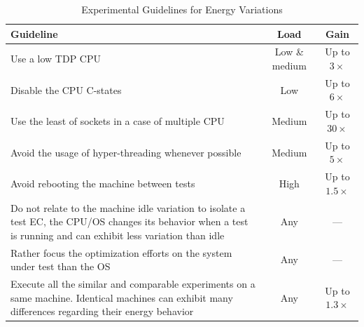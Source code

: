\begin{table}[h!]
    \centering
    \caption{Experimental Guidelines for Energy Variations}
    \small
    \begin{tabular}{|p{4.7cm}|c|c|}
        \hline
        \textbf{Guideline}                                                                                                                                                & \textbf{Load} & \textbf{Gain}     \\
        \hline
        \hline
        Use a low TDP CPU                                                                                                                                                 & Low \& medium & Up to $3\times$   \\
        \hline
        Disable the CPU C-states                                                                                                                                          & Low           & Up to $6\times$   \\
        \hline
        Use the least of sockets in a case of multiple CPU                                                                                                                & Medium        & Up to $30\times$  \\
        \hline
        Avoid the usage of hyper-threading whenever possible                                                                                                              & Medium        & Up to $5\times$   \\
        \hline
        Avoid rebooting the machine between tests                                                                                                                         & High          & Up to $1.5\times$ \\
        \hline
        Do not relate to the machine idle variation to isolate a test EC, the CPU/OS changes its behavior when a test is running and can exhibit less variation than idle & Any           & ---               \\
        \hline
        Rather focus the optimization efforts on the system under test than the OS                                                                                        & Any           & ---               \\
        \hline
        Execute all the similar and comparable experiments on a same machine. Identical machines can exhibit many differences regarding their energy behavior             & Any           & Up to $1.3\times$ \\
        \hline
    \end{tabular}
    \label{table:guidelines}
\end{table}

